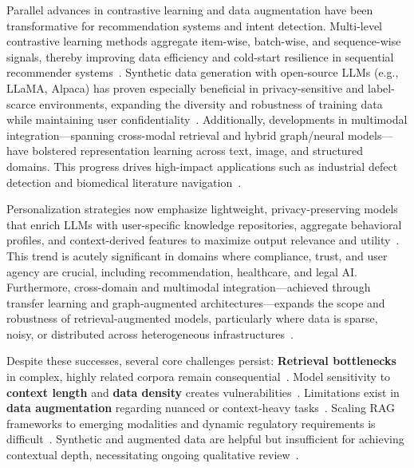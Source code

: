 \documentclass[sigconf]{acmart}
\begin{document}
Parallel advances in contrastive learning and data augmentation have been transformative for recommendation systems and intent detection. Multi-level contrastive learning methods aggregate item-wise, batch-wise, and sequence-wise signals, thereby improving data efficiency and cold-start resilience in sequential recommender systems~\cite{ref58,ref59}. Synthetic data generation with open-source LLMs (e.g., LLaMA, Alpaca) has proven especially beneficial in privacy-sensitive and label-scarce environments, expanding the diversity and robustness of training data while maintaining user confidentiality~\cite{ref57}. Additionally, developments in multimodal integration—spanning cross-modal retrieval and hybrid graph/neural models—have bolstered representation learning across text, image, and structured domains. This progress drives high-impact applications such as industrial defect detection and biomedical literature navigation~\cite{ref15,ref60}.

Personalization strategies now emphasize lightweight, privacy-preserving models that enrich LLMs with user-specific knowledge repositories, aggregate behavioral profiles, and context-derived features to maximize output relevance and utility~\cite{ref49,ref50}. This trend is acutely significant in domains where compliance, trust, and user agency are crucial, including recommendation, healthcare, and legal AI. Furthermore, cross-domain and multimodal integration—achieved through transfer learning and graph-augmented architectures—expands the scope and robustness of retrieval-augmented models, particularly where data is sparse, noisy, or distributed across heterogeneous infrastructures~\cite{ref14,ref15,ref21}.

Despite these successes, several core challenges persist:
\textbf{Retrieval bottlenecks} in complex, highly related corpora remain consequential~\cite{ref13}.
Model sensitivity to \textbf{context length} and \textbf{data density} creates vulnerabilities~\cite{ref42}.
Limitations exist in \textbf{data augmentation} regarding nuanced or context-heavy tasks~\cite{ref56}.
Scaling RAG frameworks to emerging modalities and dynamic regulatory requirements is difficult~\cite{ref36,ref40}.
Synthetic and augmented data are helpful but insufficient for achieving contextual depth, necessitating ongoing qualitative review~\cite{ref56}.
\end{document}
